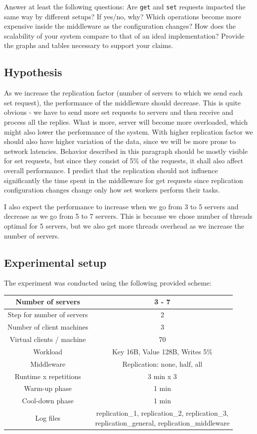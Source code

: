 \documentclass[11pt]{article}
\begin{document}
Answer at least the following questions: Are \texttt{get} and \texttt{set} requests impacted the same way by different setups? If yes/no, why? Which operations become more expensive inside the middleware as the configuration changes? How does the scalability of your system compare to that of an ideal implementation? Provide the graphs and tables necessary to support your claims.
\fi

\subsection{Hypothesis}
\label{sec:replication-hyphotesis}

As we increase the replication factor (number of servers to which we send each set request), the performance of the middleware should decrease. This is quite obvious - we have to send more set requests to servers and then receive and process all the replies. What is more, server will become more overloaded, which might also lower the performance of the system. With higher replication factor we should also have higher variation of the data, since we will be more prone to network latencies. Behavior described in this paragraph should be mostly visible for set requests, but since they consist of 5\% of the requests, it shall also affect overall performance. I predict that the replication should not influence significantly the time spent in the middleware for get requests since replication configuration changes change only how set workers perform their tasks.

I also expect the performance to increase when we go from 3 to 5 servers and decrease as we go from 5 to 7 servers. This is because we chose number of threads optimal for 5 servers, but we also get more threads overhead as we increase the number of servers.

\subsection{Experimental setup}

The experiment was conducted using the following provided scheme:

\small{
\smallskip
\begin{tabular}{|c|c|}
\hline Number of servers & 3 - 7 \\ 
\hline Step for number of servers & 2 \\
\hline Number of client machines & 3 \\ 
\hline Virtual clients / machine &  70 \\ 
\hline Workload & Key 16B, Value 128B, Writes 5\% \\
\hline Middleware & Replication: none, half, all \\ 
\hline Runtime x repetitions & 3 min x 3 \\
\hline Warm-up phase & 1 min \\
\hline Cool-down phase & 1 min \\
\hline Log files & \parbox[t]{10cm}{replication\_1, replication\_2, replication\_3, \\replication\_general, replication\_middleware} \\[3.4ex]
\hline 
\end{tabular} }
\medskip
\end{document}
